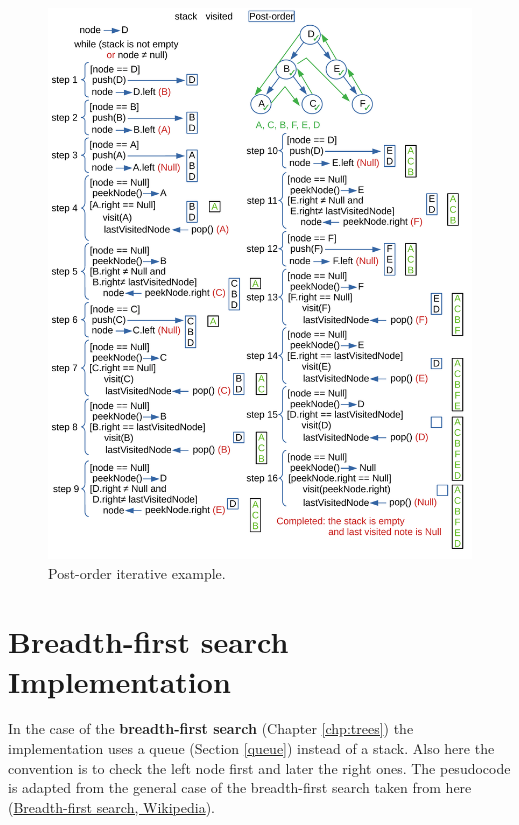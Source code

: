 \begin{figure}[H]
	\begin{center}
		\includegraphics[scale=.6]{chapters/appendix/images/appendixtree/treesappendix_3.pdf}
		\caption[Post-order iterative example.]{Post-order iterative example.}
		\label{appendixtrees_3}
	\end{center}
\end{figure}

\section{Breadth-first search Implementation}
In the case of the \textbf{breadth-first search} (Chapter \ref{chp:trees}) the implementation uses a queue (Section \ref{queue}) instead of a stack. Also here the convention is to check the left node first and later the right ones. The pesudocode is adapted from the general case of the breadth-first search taken from here \cite{wikibreadthfirst} (\href{https://en.wikipedia.org/wiki/Breadth-first_search}{Breadth-first search, Wikipedia}).

